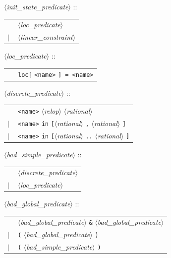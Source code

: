 \documentclass[a4paper,11pt]{report}
\newcommand{\nt}[1]{$\langle$\emph{#1}$\rangle$}
\newcommand{\regleGrammaire}[1]{\bigskip \noindent \nt{#1} :: \\}
\newcommand{\styleIMI}[1]{\textcolor{imicolor}{\texttt{#1}}}
\begin{document}
\regleGrammaire{init\_state\_predicate}
\begin{tabular}{l l}
	\  & \nt{loc\_predicate} \\
	$|$ & \nt{linear\_constraint} \\
\end{tabular}

\regleGrammaire{loc\_predicate}
\begin{tabular}{l l}
	\  & \styleIMI{loc[} \styleIMI{<name>} \styleIMI{] = \styleIMI{<name>}} \\
\end{tabular}


\regleGrammaire{discrete\_predicate}
\begin{tabular}{l l}
	\  & \styleIMI{<name>} \nt{relop} \nt{rational} \\
	$|$ & \styleIMI{<name>} \styleIMI{in} \styleIMI{[}\nt{rational} \styleIMI{,} \nt{rational} \styleIMI{]} \\
	$|$ & \styleIMI{<name>} \styleIMI{in} \styleIMI{[}\nt{rational} \styleIMI{..} \nt{rational} \styleIMI{]} \\
\end{tabular}


\regleGrammaire{bad\_simple\_predicate}
\begin{tabular}{l l}
	\  & \nt{discrete\_predicate} \\
	$|$ & \nt{loc\_predicate} \\
\end{tabular}


\regleGrammaire{bad\_global\_predicate}
\begin{tabular}{l l}
	\  & \nt{bad\_global\_predicate} \styleIMI{\&} \nt{bad\_global\_predicate} \\
	$|$ & \styleIMI{(} \nt{bad\_global\_predicate} \styleIMI{)} \\
	$|$ & \styleIMI{(} \nt{bad\_simple\_predicate} \styleIMI{)} \\
\end{tabular}
\end{document}
